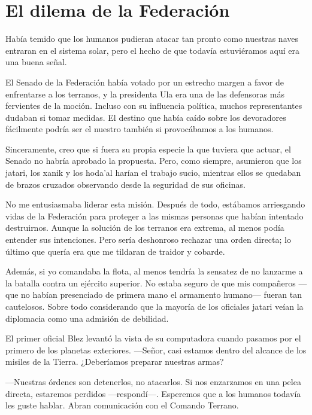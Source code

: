 \chapter{El dilema de la Federación}\label{sec:el-dilema-de-la-federacion}

Había temido que los humanos pudieran atacar tan pronto como nuestras naves entraran en el sistema solar, pero el hecho de que todavía estuviéramos aquí era una buena señal.

El Senado de la Federación había votado por un estrecho margen a favor de enfrentarse a los terranos, y la presidenta Ula era una de las defensoras más fervientes de la moción. Incluso con su influencia política, muchos representantes dudaban si tomar medidas. El destino que había caído sobre los devoradores fácilmente podría ser el nuestro también si provocábamos a los humanos.

Sinceramente, creo que si fuera su propia especie la que tuviera que actuar, el Senado no habría aprobado la propuesta. Pero, como siempre, asumieron que los jatari, los xanik y los hoda'al harían el trabajo sucio, mientras ellos se quedaban de brazos cruzados observando desde la seguridad de sus oficinas.

No me entusiasmaba liderar esta misión. Después de todo, estábamos arriesgando vidas de la Federación para proteger a las mismas personas que habían intentado destruirnos. Aunque la solución de los terranos era extrema, al menos podía entender sus intenciones. Pero sería deshonroso rechazar una orden directa; lo último que quería era que me tildaran de traidor y cobarde.

Además, si yo comandaba la flota, al menos tendría la sensatez de no lanzarme a la batalla contra un ejército superior. No estaba seguro de que mis compañeros —que no habían presenciado de primera mano el armamento humano— fueran tan cautelosos. Sobre todo considerando que la mayoría de los oficiales jatari veían la diplomacia como una admisión de debilidad.

El primer oficial Blez levantó la vista de su computadora cuando pasamos por el primero de los planetas exteriores. —Señor, casi estamos dentro del alcance de los misiles de la Tierra. ¿Deberíamos preparar nuestras armas?

—Nuestras órdenes son detenerlos, no atacarlos. Si nos enzarzamos en una pelea directa, estaremos perdidos —respondí—. Esperemos que a los humanos todavía les guste hablar. Abran comunicación con el Comando Terrano.

